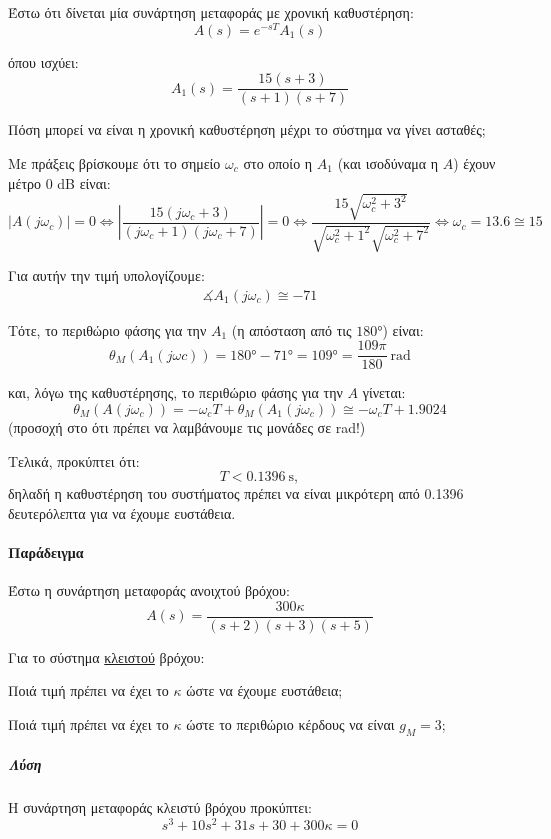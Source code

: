 \documentclass[11pt,a4paper,notitlepage,fleqn,final]{article}
\begin{document}
\begin{exercise}[Παράδειγμα]
Έστω ότι δίνεται μία συνάρτηση μεταφοράς με χρονική καθυστέρηση:
\[
A(s) = e^{-sT} A_1(s)
\]

όπου ισχύει:
\[
A_1(s) = \frac{15(s+3)}{(s+1)(s+7)}
\]

Πόση μπορεί να είναι η χρονική καθυστέρηση μέχρι το σύστημα
να γίνει ασταθές;

\tcblower
Με πράξεις βρίσκουμε ότι το σημείο \( \omega_c \) στο οποίο η \( A_1 \) (και
ισοδύναμα η \( A \)) έχουν μέτρο 0 dB είναι:
\[
\left|A(j\omega_c)\right| = 0
\iff \left|\frac{15(j\omega_c + 3)}{(j\omega_c+1)(j\omega_c+7)}\right| = 0
\iff \frac{15\sqrt{\omega_c^2 + 3^2}}{\sqrt{\omega_c^2 + 1^2}\sqrt{\omega_c^2 + 7^2}}
\iff
\omega_c = 13.6 \cong 15
\]

Για αυτήν την τιμή υπολογίζουμε:
\begin{align*}
	\measuredangle A_1(j\omega_c) \cong -71
\end{align*}

Τότε, το περιθώριο φάσης
για την \( A_1 \) (η απόσταση από τις \( \ang{180} \)) είναι:
\[
\theta_M\left( A_1(j\omega c) \right)
= \ang{180} - \ang{71} = \ang{109}
= \frac{109π}{180} \ \mathrm{rad}
\]

και, λόγω της καθυστέρησης, το περιθώριο φάσης για την \( A \)
γίνεται:
\[
\theta_M\left( A(j\omega_c) \right)
= -\omega_c T + \theta_M \left( A_1(j\omega_c) \right)
\cong -\omega_c T + 1.9024
\]
(προσοχή στο ότι πρέπει να λαμβάνουμε τις μονάδες σε rad!)

Τελικά, προκύπτει ότι:
\[
T < \SI{0.1396}{\second},
\]
δηλαδή η καθυστέρηση του συστήματος πρέπει να είναι μικρότερη από
0.1396 δευτερόλεπτα για να έχουμε ευστάθεια.

\end{exercise}
\paragraph{Παράδειγμα}
Έστω η συνάρτηση μεταφοράς ανοιχτού βρόχου:
\[
A(s) = \frac{300κ}{(s+2)(s+3)(s+5)}
\]

Για το σύστημα \underline{κλειστού} βρόχου:
\begin{enumparen}
	\item Ποιά τιμή πρέπει να έχει το \( κ \) ώστε να έχουμε ευστάθεια;
	\item Ποιά τιμή πρέπει να έχει το \( κ \) ώστε το περιθώριο κέρδους
	να είναι \( g_M = 3 \);
\end{enumparen}

\subparagraph{Λύση}
Η συνάρτηση μεταφοράς κλειστύ βρόχου προκύπτει:
\[
s^3+10s^2+31s+30+300κ = 0
\]
\end{document}
